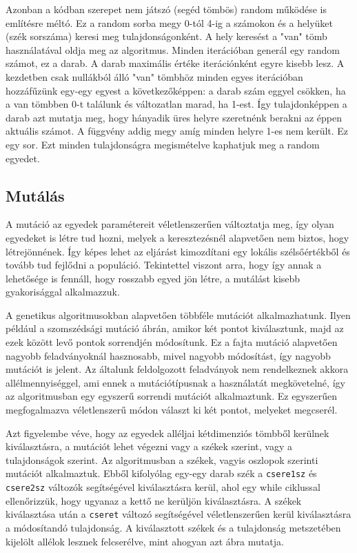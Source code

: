 \documentclass[12pt,a4paper,oneside]{report}
\begin{document}
        
        Azonban a kódban szerepet nem játszó (segéd tömbös) random
        működése is említésre méltó.
        Ez a random sorba megy 0-tól 4-ig a számokon és a helyüket (szék sorszáma) keresi meg tulajdonságonként.
        A hely keresést a "van" tömb használatával oldja meg az algoritmus.
        Minden iterációban generál egy random számot, ez a darab.
        A darab maximális értéke iterációnként egyre kisebb lesz.
        A kezdetben csak nullákból álló "van" tömbhöz minden egyes iterációban hozzáfűzünk egy-egy egyest a következőképpen: a darab szám eggyel csökken, ha a van tömbben 0-t találunk és változatlan marad, ha 1-est.
        Így tulajdonképpen a darab azt mutatja meg, hogy hányadik üres helyre szeretnénk berakni az éppen aktuális számot.
        A függvény addig megy amíg minden helyre 1-es nem került.
        Ez egy sor.
        Ezt minden tulajdonságra megismételve kaphatjuk meg a random egyedet.
            
        \subsection{Mutálás} %
           		 A mutáció az egyedek paramétereit véletlenszerűen változtatja meg, így olyan egyedeket is létre tud hozni, melyek a keresztezésnél alapvetően nem biztos, hogy létrejönnének. Így képes lehet az eljárást kimozdítani egy lokális szélsőértékből és tovább tud fejlődni a 		populáció. Tekintettel viszont arra, hogy így annak a lehetősége is fennáll, hogy rosszabb egyed jön létre, a mutálást kisebb gyakorisággal alkalmazzuk. 
		
	
	A genetikus algoritmusokban alapvetően többféle mutációt alkalmazhatunk. Ilyen például a szomszédsági mutáció   ábrán, amikor két pontot kiválasztunk, majd az ezek között levő pontok sorrendjén módosítunk. Ez a fajta mutáció alapvetően nagyobb feladványoknál hasznosabb, 		mivel nagyobb módosítást, így nagyobb mutációt is jelent. Az általunk feldolgozott feladványok nem rendelkeznek akkora allélmennyiséggel, ami ennek a mutációtípusnak a használatát megkövetelné, így az algoritmusban egy egyszerű sorrendi mutációt alkalmaztunk. Ez 		egyszerűen megfogalmazva véletlenszerű módon választ ki két pontot, melyeket megcserél.

		
	Azt figyelembe véve, hogy az egyedek alléljai kétdimenziós tömbből kerülnek kiválasztásra, a mutációt lehet végezni vagy a székek szerint, vagy a tulajdonságok szerint. Az algoritmusban a székek, vagyis oszlopok szerinti mutációt alkalmaztuk.
	Ebből kifolyólag egy-egy darab szék a \texttt{csere1sz} és \texttt{csere2sz} változók segítségével kiválasztásra kerül, ahol egy while ciklussal ellenőrizzük, hogy ugyanaz a kettő ne kerüljön kiválasztásra. A székek kiválasztása után a \texttt{cseret} változó segítségével véletlenszerűen kerül kiválasztásra a módosítandó tulajdonság. A kiválasztott székek és a tulajdonság metszetében kijelölt allélok lesznek felcserélve, mint ahogyan azt   ábra mutatja.
	
\end{document}
